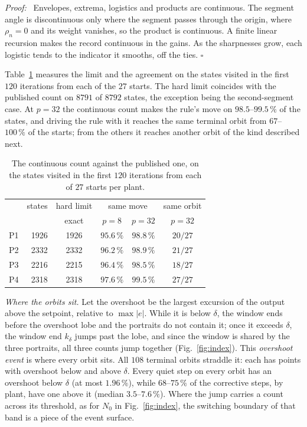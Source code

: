 \documentclass[letterpaper, 10 pt, conference]{ieeeconf}
\renewenvironment{proof}{\noindent\textit{Proof:}\ }{\hfill$\square$\par\smallskip}
\begin{document}
\begin{proof}
Envelopes, extrema, logistics and products are continuous. The segment angle
is discontinuous only where the segment passes through the origin, where
$\rho_n = 0$ and its weight vanishes, so the product is continuous. A finite
linear recursion makes the record continuous in the gains. As the
sharpnesses grow, each logistic tends to the indicator it smooths, off the
ties.
\end{proof}

Table~\ref{tab:fidelity} measures the limit and the agreement on the states
visited in the first $120$ iterations from each of the $27$ starts. The hard
limit coincides with the published count on $8791$ of $8792$ states, the
exception being the second-segment case. At $p = 32$ the continuous count makes
the rule's move on $98.5$--$99.5\,\%$ of the states, and driving the rule with
it reaches the same terminal orbit from $67$--$100\,\%$ of the starts; from the
others it reaches another orbit of the kind described next.

\begin{table}[t]
\centering\small
\caption{The continuous count against the published one, on the states
visited in the first $120$ iterations from each of $27$ starts per plant.}
\label{tab:fidelity}
\setlength{\tabcolsep}{4pt}
\begin{tabular}{lrcccc}
\toprule
 & states & hard limit & \multicolumn{2}{c}{same move} & same orbit \\
 & & exact & $p=8$ & $p=32$ & $p=32$ \\
\midrule
P1 & 1926 & 1926 & $95.6\,\%$ & $98.8\,\%$ & $20/27$ \\
P2 & 2332 & 2332 & $96.2\,\%$ & $98.9\,\%$ & $21/27$ \\
P3 & 2216 & 2215 & $96.4\,\%$ & $98.5\,\%$ & $18/27$ \\
P4 & 2318 & 2318 & $97.6\,\%$ & $99.5\,\%$ & $27/27$ \\
\bottomrule
\end{tabular}
\end{table}

\emph{Where the orbits sit.} Let the overshoot be the largest excursion of the
output above the setpoint, relative to $\max|e|$. While it is below $\delta$,
the window ends before the overshoot lobe and the portraits do not contain
it; once it exceeds $\delta$, the window end $k_\delta$ jumps past the lobe, and
since the window is shared by the three portraits, all three counts jump
together (Fig.~\ref{fig:index}). This \emph{overshoot event} is where every
orbit sits. All $108$ terminal orbits straddle it: each has points with
overshoot below and above $\delta$. Every quiet step on every orbit has an
overshoot below $\delta$ (at most $1.96\,\%$), while $68$--$75\,\%$ of the
corrective steps, by plant, have one above it (median $3.5$--$7.6\,\%$). Where
the jump carries a count across its threshold, as for $N_0$ in
Fig.~\ref{fig:index}, the switching boundary of that band is a piece of the
event surface.
\end{document}
